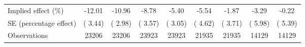 {\begin{tabular}{l*{8}{c}}
\hline
Implied effect (\%)&      -12.01         &      -10.96         &       -8.78         &       -5.40         &       -5.54         &       -1.87         &       -3.29         &       -0.22         \\
SE (percentage effect)&    (  3.44)         &    (  2.98)         &    (  3.57)         &    (  3.05)         &    (  4.62)         &    (  3.71)         &    (  5.98)         &    (  5.39)         \\
Observations&       23206         &       23206         &       23923         &       23923         &       21935         &       21935         &       14129         &       14129         \\
\hline\hline
\end{tabular}
}
